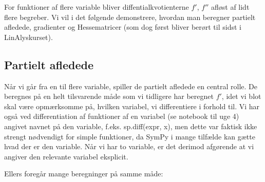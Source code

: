 \documentclass[letterpaper,10pt,english]{jupyterBook}
\begin{document}
\begin{sphinxVerbatim}[commandchars=\\\{\}]
                       
                
\end{sphinxVerbatim}

For funktioner af flere variable bliver diffentialkvotienterne \(f'\), \(f''\) afløst af lidt flere begreber. Vi vil i det følgende demonstrere, hvordan man beregner partielt afledede, gradienter og Hesse\sphinxhyphen{}matricer (som dog først bliver berørt til sidst i LinAlys\sphinxhyphen{}kurset).


\subsection{Partielt afledede}
\label{\detokenize{notebooks/sympy/Notebook_FlereVar_analyse:partielt-afledede}}
Når vi går fra en til flere variable, spiller de partielt afledede en central rolle. De beregnes på en helt tilsvarende måde som vi tidligere har beregnet \(f'\), idet vi blot skal være opmærksomme på, hvilken variabel, vi differentiere i forhold til. Vi har også ved differentiation af funktioner af en variabel (se notebook til uge 4) angivet navnet på den variable, f.eks. sp.diff(expr, x), men dette var faktisk ikke strengt nødvendigt for simple funktioner, da SymPy i mange tilfælde kan gætte hvad der er den variable. Når vi har to variable, er det derimod afgørende at vi angiver den relevante variabel eksplicit.

Ellers foregår mange beregninger på samme måde:
\end{document}
